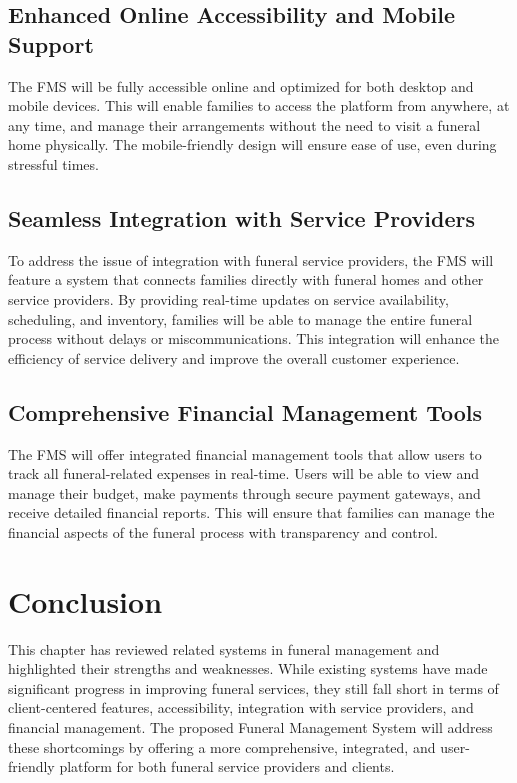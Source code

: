 \documentclass[a4paper,12pt]{report}
\begin{document}
\subsection{Enhanced Online Accessibility and Mobile Support}
The FMS will be fully accessible online and optimized for both desktop and mobile devices. This will enable families to access the platform from anywhere, at any time, and manage their arrangements without the need to visit a funeral home physically. The mobile-friendly design will ensure ease of use, even during stressful times.

\subsection{Seamless Integration with Service Providers}
To address the issue of integration with funeral service providers, the FMS will feature a system that connects families directly with funeral homes and other service providers. By providing real-time updates on service availability, scheduling, and inventory, families will be able to manage the entire funeral process without delays or miscommunications. This integration will enhance the efficiency of service delivery and improve the overall customer experience.

\subsection{Comprehensive Financial Management Tools}
The FMS will offer integrated financial management tools that allow users to track all funeral-related expenses in real-time. Users will be able to view and manage their budget, make payments through secure payment gateways, and receive detailed financial reports. This will ensure that families can manage the financial aspects of the funeral process with transparency and control.

\section{Conclusion}
This chapter has reviewed related systems in funeral management and highlighted their strengths and weaknesses. While existing systems have made significant progress in improving funeral services, they still fall short in terms of client-centered features, accessibility, integration with service providers, and financial management. The proposed Funeral Management System will address these shortcomings by offering a more comprehensive, integrated, and user-friendly platform for both funeral service providers and clients.
\end{document}
